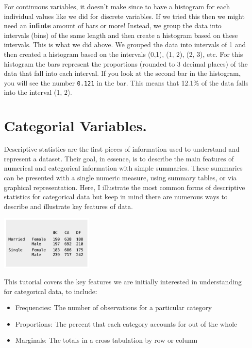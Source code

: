 \documentclass[
  letterpaper,
  DIV=11,
  numbers=noendperiod]{scrreprt}
\providecommand{\tightlist}{%
  \setlength{\itemsep}{0pt}\setlength{\parskip}{0pt}}\usepackage{longtable,booktabs,array}
\begin{document}
For continuous variables, it doesn't make since to have a histogram for
each individual values like we did for discrete variables. If we tried
this then we might need an \textbf{infinte} amount of bars or more!
Instead, we group the data into intervals (bins) of the same length and
then create a histogram based on these intervals. This is what we did
above. We grouped the data into intervals of 1 and then created a
histogram based on the intervals (0,1), (1, 2), (2, 3), etc. For this
histogram the bars represent the proportions (rounded to 3 decimal
places) of the data that fall into each interval. If you look at the
second bar in the histogram, you will see the number \texttt{0.121} in
the bar. This means that 12.1\% of the data falls into the interval (1,
2).


\chapter*{Categorial Variables.}\label{categorial-variables.}


Descriptive statistics are the first pieces of information used to
understand and represent a dataset. Their goal, in essence, is to
describe the main features of numerical and categorical information with
simple summaries. These summaries can be presented with a single numeric
measure, using summary tables, or via graphical representation. Here, I
illustrate the most common forms of descriptive statistics for
categorical data but keep in mind there are numerous ways to describe
and illustrate key features of data.

\includegraphics[width=0.35\textwidth,height=\textheight]{./images/Daily-6-Pic-1.jpg}

This tutorial covers the key features we are initially interested in
understanding for categorical data, to include:

\begin{itemize}
\tightlist
\item
  Frequencies: The number of observations for a particular category
\item
  Proportions: The percent that each category accounts for out of the
  whole
\item
  Marginals: The totals in a cross tabulation by row or column
\end{itemize}
\end{document}
